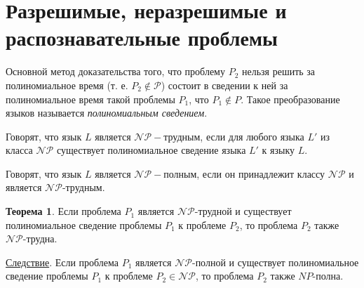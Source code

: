 \section{Разрешимые, неразрешимые и распознавательные проблемы}
Основной метод доказательства того, что проблему $P_2$ нельзя решить за полиномиальное время (т. е. $P_2 \not\in \mathscr{P}$) состоит в сведении к ней за полиномиальное время такой проблемы $P_1$, что $P_1 \not\in P$. Такое преобразование языков называется \textit{полиномиальным сведением}.

\dftion Говорят, что язык $L$ является $\mathscr{NP}-\text{трудным}$, если для любого языка $L'$ из класса $\mathscr{NP}$ существует полиномиальное сведение языка $L'$ к языку $L$.

\dftion Говорят, что язык $L$ является $\mathscr{NP}-\textbf{полным}$, если он принадлежит классу $\mathscr{NP}$ и является $\mathscr{NP}\text{-трудным}$.

\textbf{Теорема 1}. Если проблема $P_1$ является $\mathscr{NP}$-трудной и существует полиномиальное сведение проблемы $P_1$ к проблеме $P_2$, то проблема $P_2$ также $\mathscr{NP}$-трудна.

\underline{Следствие}. Если проблема $P_1$ является $\mathscr{NP}$-полной и существует полиномиальное сведение проблемы $P_1$ к проблеме $P_2 \in \mathscr{NP}$, то проблема $P_2$ также $NP$-полна.
